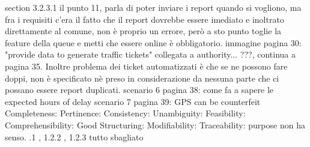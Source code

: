 \newline
section 3.2.3.1 il punto 11, parla di poter inviare i report quando si vogliono, ma fra i requisiti c'era il fatto che il report dovrebbe essere imediato e inoltrato direttamente al comune, non è proprio un errore, però a sto punto toglie la feature della queue e metti che essere online è obbligatorio.\newline
\newline
immagine pagina 30: "provide data to generate traffic tickets" collegata a authority... ???, continua a pagina 35. \newline
Inoltre problema dei ticket automatizzati è che se ne possono fare doppi, non è specificato nè preso in considerazione da nessuna parte che ci possano essere report duplicati.
\newline
\newline
scenario 6 pagina 38: come fa a sapere le expected hours of delay \newline
scenario 7 pagina 39: GPS can be counterfeit \newline
\newline
Completeness:
\newline
\newline
Pertinence:
\newline
\newline
Consistency:
\newline
\newline
Unambiguity:
\newline
\newline
Feasibility:
\newline
\newline
Comprehensibility:
\newline
\newline
Good Structuring:
\newline
\newline
Modifiability:
\newline
\newline
Traceability:
\newline
\newline
\newline
purpose non ha senso.\newline
{}.1 , 1.2.2 , 1.2.3 tutto sbagliato \newline
\newline
